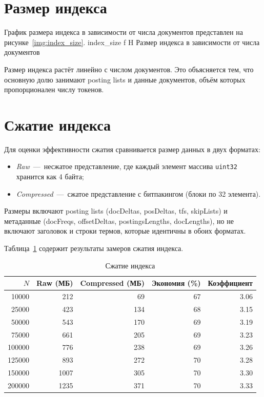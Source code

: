 \documentclass{itmo}
\begin{document}
\section{Размер индекса}

График размера индекса в зависимости от числа документов представлен на рисунке~\ref{img:index_size}.
	{index_size}
	{f}
	{H}
	{\textwidth}
	{Размер индекса в зависимости от числа документов}

Размер индекса растёт линейно с числом документов.
Это объясняется тем, что основную долю занимают posting lists и данные документов, объём которых пропорционален числу токенов.

\section{Сжатие индекса}

Для оценки эффективности сжатия сравнивается размер данных в двух форматах:
\begin{itemize}
	\item \textit{Raw}~---~несжатое представление, где каждый элемент массива \texttt{uint32} хранится как 4 байта;
	\item \textit{Compressed}~---~сжатое представление с битпакингом (блоки по 32 элемента).
\end{itemize}

Размеры включают posting lists (docDeltas, posDeltas, tfs, skipLists) и метаданные (docFreqs, offsetDeltas, postingsLengths, docLengths), но не включают заголовок и строки термов, которые идентичны в обоих форматах.

Таблица~\ref{tab:compression} содержит результаты замеров сжатия индекса.
\begin{table}[H]
	\centering
	\caption{Сжатие индекса}
	\label{tab:compression}
	\begin{tabular}{|r|r|r|r|r|}
		\toprule
		$N$ & Raw (МБ) & Compressed (МБ) & Экономия (\%) & Коэффициент \\
		\midrule
		10000  & 212  & 69  & 67  & 3.06 \\
		25000  & 423  & 134 & 68  & 3.15 \\
		50000  & 543  & 170 & 69  & 3.19 \\
		75000  & 661  & 205 & 69  & 3.23 \\
		100000 & 776  & 238 & 69  & 3.26 \\
		125000 & 893  & 272 & 70  & 3.28 \\
		150000 & 1007 & 305 & 70  & 3.30 \\
		200000 & 1235 & 371 & 70  & 3.33 \\
		\bottomrule
	\end{tabular}
\end{table}
\end{document}
